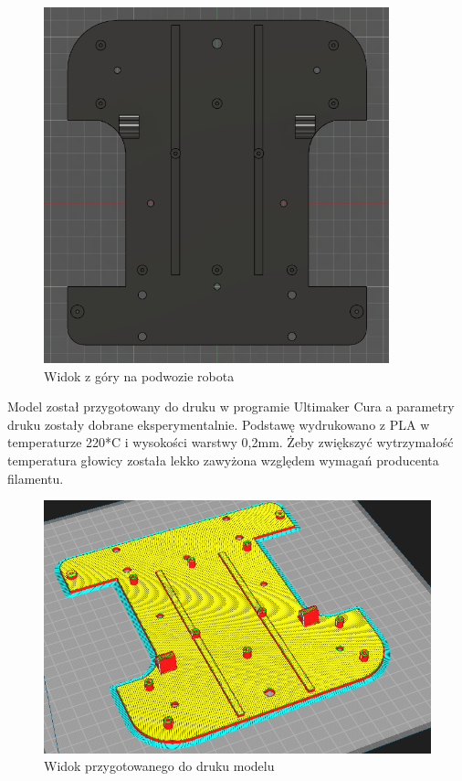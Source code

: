 \begin{figure}[H]
	\centering
	\includegraphics[width=10cm]{pages/robot/zdjecia/robotModelRama.png}
	\caption{Widok z góry na podwozie robota}
	\label{Fig:Rysunek}
\end{figure}
Model został przygotowany do druku w programie Ultimaker Cura a parametry druku zostały dobrane 
eksperymentalnie. Podstawę wydrukowano z PLA w temperaturze 220*C i wysokości warstwy 0,2mm. 
Żeby zwiększyć wytrzymałość temperatura głowicy została lekko zawyżona względem wymagań producenta filamentu.
\begin{figure}[H]
	\centering
	\includegraphics[width=13cm]{pages/robot/zdjecia/robotRamaCura.png}
	\caption{Widok przygotowanego do druku modelu}
	\label{fig:Rysunek}
\end{figure}
